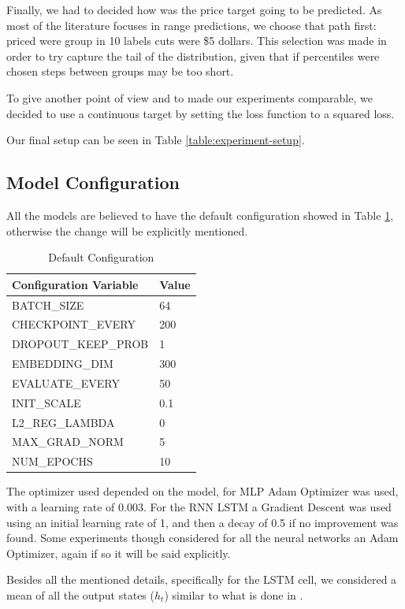 \documentclass[11pt,letterpaper]{article}
\begin{document}
Finally, we had to decided how was the price target going to be predicted. As most of the literature focuses in range predictions, we choose that path first: priced were group in 10 labels cuts were \$5 dollars. This selection was made in order to try capture the tail of the distribution, given that if percentiles were chosen steps between groups may be too short. 

To give another point of view and to made our experiments comparable, we decided to use a continuous target by setting the loss function to a squared loss.

Our final setup can be seen in Table \ref{table:experiment-setup}. 

\subsection{Model Configuration}

All the models are believed to have the default configuration showed in Table \ref{table:def-config}, otherwise the change will be explicitly mentioned.
\begin{table}[ht!]
\centering
\caption{Default Configuration}
\label{table:def-config}
\scalebox{0.8} 
{\begin{tabular}{|l|l|}
\hline
\textbf{Configuration Variable} & \textbf{Value} \\ \hline \hline
BATCH\_SIZE & 64 \\ 
CHECKPOINT\_EVERY & 200 \\ 
DROPOUT\_KEEP\_PROB & 1 \\ 
EMBEDDING\_DIM & 300 \\ 
EVALUATE\_EVERY & 50 \\ 
INIT\_SCALE & 0.1 \\ 
L2\_REG\_LAMBDA & 0 \\ 
MAX\_GRAD\_NORM & 5 \\ 
NUM\_EPOCHS & 10 \\ \hline \hline
\end{tabular}}
\end{table}

The optimizer used depended on the model, for MLP Adam Optimizer was used, with a learning rate of 0.003. For the RNN LSTM a Gradient Descent was used using an initial learning rate of 1, and then a decay of 0.5 if no improvement was found.  Some experiments though considered for all the neural networks an Adam Optimizer, again if so it will be said explicitly. 

Besides all the mentioned details, specifically for the LSTM cell, we considered a mean of all the output states ($h_t$) similar to what is done in .
\end{document}
